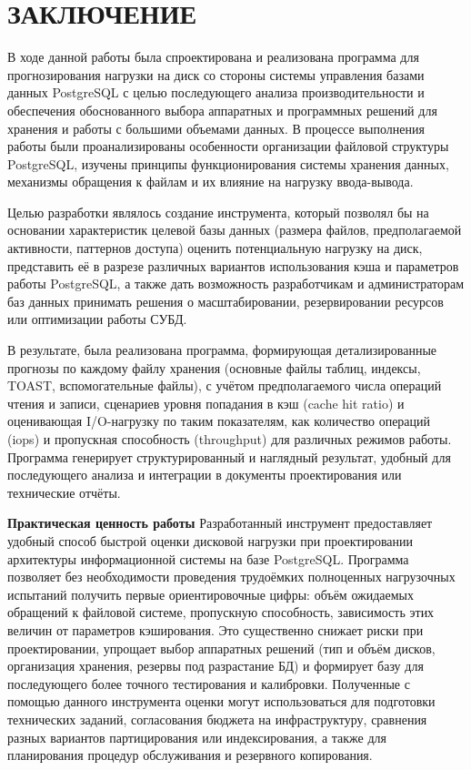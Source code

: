 \section*{\centering ЗАКЛЮЧЕНИЕ}

В ходе данной работы была спроектирована и реализована программа для прогнозирования нагрузки на диск со стороны 
системы управления базами данных PostgreSQL с целью последующего анализа производительности и обеспечения обоснованного 
выбора аппаратных и программных решений для хранения и работы с большими объемами данных. В процессе выполнения работы 
были проанализированы особенности организации файловой структуры PostgreSQL, изучены принципы функционирования системы 
хранения данных, механизмы обращения к файлам и их влияние на нагрузку ввода-вывода.

Целью разработки являлось создание инструмента, который позволял бы на основании характеристик целевой базы данных 
(размера файлов, предполагаемой активности, паттернов доступа) оценить потенциальную нагрузку на диск, представить её 
в разрезе различных вариантов использования кэша и параметров работы PostgreSQL, а также дать возможность разработчикам 
и администраторам баз данных принимать решения о масштабировании, резервировании ресурсов или оптимизации работы СУБД.

В результате, была реализована программа, формирующая детализированные прогнозы по каждому файлу хранения 
(основные файлы таблиц, индексы, TOAST, вспомогательные файлы), с учётом предполагаемого числа операций чтения и записи, 
сценариев уровня попадания в кэш (cache hit ratio) и оценивающая I/O-нагрузку по таким показателям, как количество 
операций (iops) и пропускная способность (throughput) для различных режимов работы. Программа генерирует структурированный 
и наглядный результат, удобный для последующего анализа и интеграции в документы проектирования или технические отчёты.

\textbf{Практическая ценность работы}
Разработанный инструмент предоставляет удобный способ быстрой оценки дисковой нагрузки при проектировании архитектуры 
информационной системы на базе PostgreSQL. Программа позволяет без необходимости проведения трудоёмких полноценных 
нагрузочных испытаний получить первые ориентировочные цифры: объём ожидаемых обращений к файловой системе, пропускную 
способность, зависимость этих величин от параметров кэширования. Это существенно снижает риски при проектировании, 
упрощает выбор аппаратных решений (тип и объём дисков, организация хранения, резервы под разрастание БД) и формирует 
базу для последующего более точного тестирования и калибровки. Полученные с помощью данного инструмента оценки могут 
использоваться для подготовки технических заданий, согласования бюджета на инфраструктуру, сравнения разных вариантов 
партицирования или индексирования, а также для планирования процедур обслуживания и резервного копирования.

